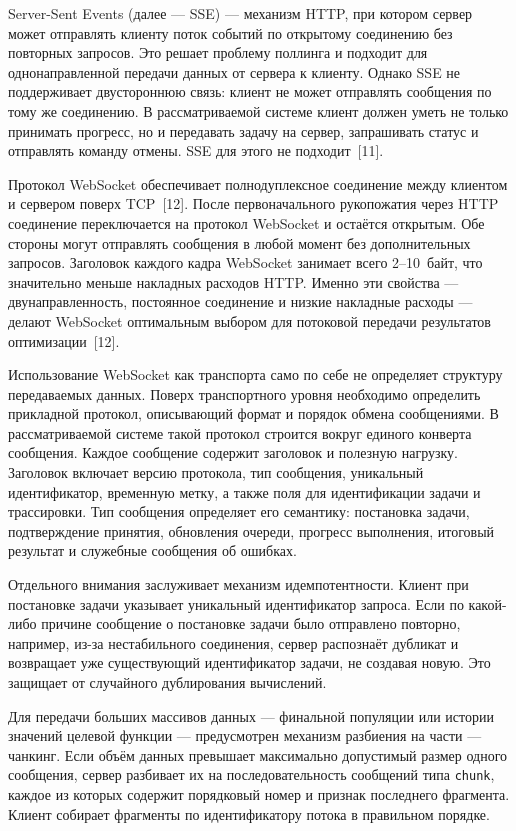 \documentclass[14pt, russian]{scrartcl}
\begin{document}
Server-Sent Events (далее --- SSE) --- механизм HTTP, при котором сервер может
отправлять клиенту поток событий по открытому соединению без повторных
запросов. Это решает проблему поллинга и подходит для однонаправленной
передачи данных от сервера к клиенту. Однако SSE не поддерживает
двустороннюю связь: клиент не может отправлять сообщения по тому же
соединению. В рассматриваемой системе клиент должен уметь не только
принимать прогресс, но и передавать задачу на сервер, запрашивать статус
и отправлять команду отмены. SSE для этого не подходит~[11].

Протокол WebSocket обеспечивает полнодуплексное соединение между клиентом
и сервером поверх TCP~[12]. После первоначального рукопожатия через HTTP
соединение переключается на протокол WebSocket и остаётся открытым.
Обе стороны могут отправлять сообщения в любой момент без дополнительных
запросов. Заголовок каждого кадра WebSocket занимает всего 2--10~байт,
что значительно меньше накладных расходов HTTP. Именно эти свойства ---
двунаправленность, постоянное соединение и низкие накладные расходы ---
делают WebSocket оптимальным выбором для потоковой передачи результатов
оптимизации~[12].

Использование WebSocket как транспорта само по себе не определяет
структуру передаваемых данных. Поверх транспортного уровня необходимо
определить прикладной протокол, описывающий формат и порядок обмена
сообщениями. В рассматриваемой системе такой протокол строится вокруг
единого конверта сообщения. Каждое сообщение содержит заголовок и
полезную нагрузку. Заголовок включает версию протокола, тип сообщения,
уникальный идентификатор, временную метку, а также поля для
идентификации задачи и трассировки. Тип сообщения определяет его
семантику: постановка задачи, подтверждение принятия, обновления очереди,
прогресс выполнения, итоговый результат и служебные сообщения об ошибках.

Отдельного внимания заслуживает механизм идемпотентности. Клиент при
постановке задачи указывает уникальный идентификатор запроса. Если
по какой-либо причине сообщение о постановке задачи было отправлено
повторно, например, из-за нестабильного соединения, сервер распознаёт
дубликат и возвращает уже существующий идентификатор задачи, не создавая
новую. Это защищает от случайного дублирования вычислений.

Для передачи больших массивов данных --- финальной популяции или истории
значений целевой функции --- предусмотрен механизм разбиения на части --- чанкинг. 
Если объём данных превышает максимально допустимый размер
одного сообщения, сервер разбивает их на последовательность сообщений
типа \texttt{chunk}, каждое из которых содержит порядковый номер и
признак последнего фрагмента. Клиент собирает фрагменты по идентификатору
потока в правильном порядке.
\end{document}
